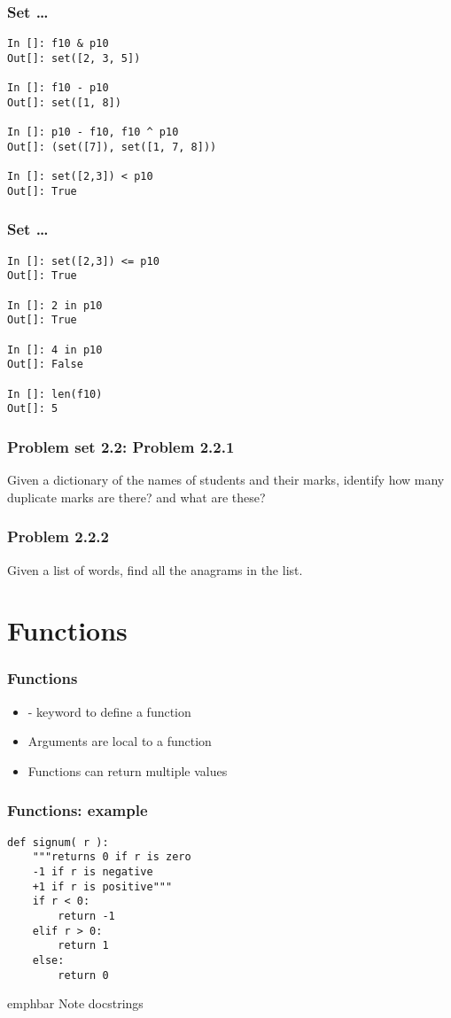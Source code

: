 \documentclass[14pt,compress]{beamer}
\newcommand{\emphbar}[1]
{\begin{beamercolorbox}[rounded=true]{emphbar} 
      {#1}
 \end{beamercolorbox}
}
\newcommand{\kwrd}[1]{ \texttt{\textbf{\color{blue}{#1}}}  }
\begin{document}
\begin{frame}[fragile]
  \frametitle{Set \ldots}
    \begin{lstlisting}
In []: f10 & p10
Out[]: set([2, 3, 5])

In []: f10 - p10
Out[]: set([1, 8])

In []: p10 - f10, f10 ^ p10
Out[]: (set([7]), set([1, 7, 8]))

In []: set([2,3]) < p10
Out[]: True
\end{lstlisting}
\end{frame}

\begin{frame}[fragile]
  \frametitle{Set \ldots}
    \begin{lstlisting}
In []: set([2,3]) <= p10
Out[]: True

In []: 2 in p10
Out[]: True

In []: 4 in p10
Out[]: False

In []: len(f10)
Out[]: 5
\end{lstlisting}
\end{frame}

\begin{frame}
  \frametitle{Problem set 2.2: Problem 2.2.1}
Given a dictionary of the names of students and their marks, identify how many duplicate marks are there? and what are these?
\end{frame}

\begin{frame}
  \frametitle{Problem 2.2.2}
Given a list of words, find all the anagrams in the list.

\end{frame}

\section{Functions}
\begin{frame}[fragile]
  \frametitle{Functions}
  \begin{itemize}
    \item \kwrd{def} - keyword to define a function
    \item Arguments are local to a function
    \item Functions can return multiple values
  \end{itemize}
\end{frame}

\begin{frame}[fragile]
  \frametitle{Functions: example}
  \begin{lstlisting}
def signum( r ):
    """returns 0 if r is zero
    -1 if r is negative
    +1 if r is positive"""
    if r < 0:
        return -1
    elif r > 0:
        return 1
    else:
        return 0
  \end{lstlisting}
  \emphbar{Note docstrings}
\end{frame}
\end{document}
